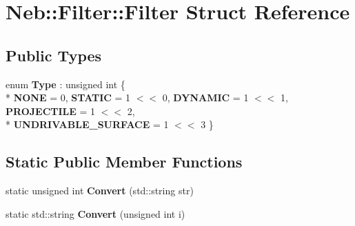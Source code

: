 \hypertarget{structNeb_1_1Filter_1_1Filter}{\section{Neb\-:\-:Filter\-:\-:Filter Struct Reference}
\label{structNeb_1_1Filter_1_1Filter}
}
\subsection*{Public Types}
\begin{DoxyCompactItemize}
\item 
enum {\bfseries Type} \-: unsigned int \{ \\*
{\bfseries N\-O\-N\-E} = 0, 
{\bfseries S\-T\-A\-T\-I\-C} = 1 $<$$<$ 0, 
{\bfseries D\-Y\-N\-A\-M\-I\-C} = 1 $<$$<$ 1, 
{\bfseries P\-R\-O\-J\-E\-C\-T\-I\-L\-E} = 1 $<$$<$ 2, 
\\*
{\bfseries U\-N\-D\-R\-I\-V\-A\-B\-L\-E\-\_\-\-S\-U\-R\-F\-A\-C\-E} = 1 $<$$<$ 3
 \}
\end{DoxyCompactItemize}
\subsection*{Static Public Member Functions}
\begin{DoxyCompactItemize}
\item 
\hypertarget{structNeb_1_1Filter_1_1Filter_a6175f815cd0bf934403cb6cbba1436d7}{static unsigned int {\bfseries Convert} (std\-::string str)}\label{structNeb_1_1Filter_1_1Filter_a6175f815cd0bf934403cb6cbba1436d7}

\item 
\hypertarget{structNeb_1_1Filter_1_1Filter_a50a74864ce9b5fb2c9c9daf8f8ed7e08}{static std\-::string {\bfseries Convert} (unsigned int i)}\label{structNeb_1_1Filter_1_1Filter_a50a74864ce9b5fb2c9c9daf8f8ed7e08}

\end{DoxyCompactItemize}
